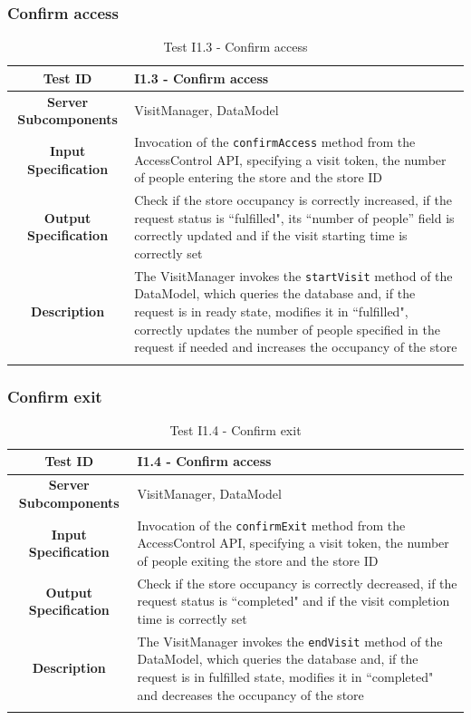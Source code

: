 \documentclass[a4paper,oneside,11pt]{book}
\begin{document}
    \subsubsection{Confirm access}
    \begin{longtable}[c]{|>{\bfseries{}}c|H{.5\textwidth}|}
        \hline
        Test ID & I1.3 - Confirm access \\ \hline
        Server Subcomponents & VisitManager, DataModel \\ \hline
        Input Specification & Invocation of the \texttt{confirmAccess} method from the AccessControl API, specifying a visit token, the number of people entering the store and the store ID \\ \hline
        Output Specification & Check if the store occupancy is correctly increased, if the request status is ``fulfilled", its “number of people” field is correctly updated and if the visit starting time is correctly set \\ \hline
        Description & The VisitManager invokes the \texttt{startVisit} method of the DataModel, which queries the database and, if the request is in ready state, modifies it in ``fulfilled", correctly updates the number of people specified in the request if needed and increases the occupancy of the store \\ \hline
        \caption{Test I1.3 - Confirm access}
        \label{table:test_I1.3}
    \end{longtable}
    
    \subsubsection{Confirm exit}
    \begin{longtable}[c]{|>{\bfseries{}}c|H{.5\textwidth}|}
        \hline
        Test ID & I1.4 - Confirm access \\ \hline
        Server Subcomponents & VisitManager, DataModel \\ \hline
        Input Specification & Invocation of the \texttt{confirmExit} method from the AccessControl API, specifying a visit token, the number of people exiting the store and the store ID \\ \hline
        Output Specification & Check if the store occupancy is correctly decreased, if the request status is ``completed" and if the visit completion time is correctly set \\ \hline
        Description & The VisitManager invokes the \texttt{endVisit} method of the DataModel, which queries the database and, if the request is in fulfilled state, modifies it in ``completed" and decreases the occupancy of the store \\ \hline
        \caption{Test I1.4 - Confirm exit}
        \label{table:test_I1.4}
    \end{longtable}
    
\end{document}
